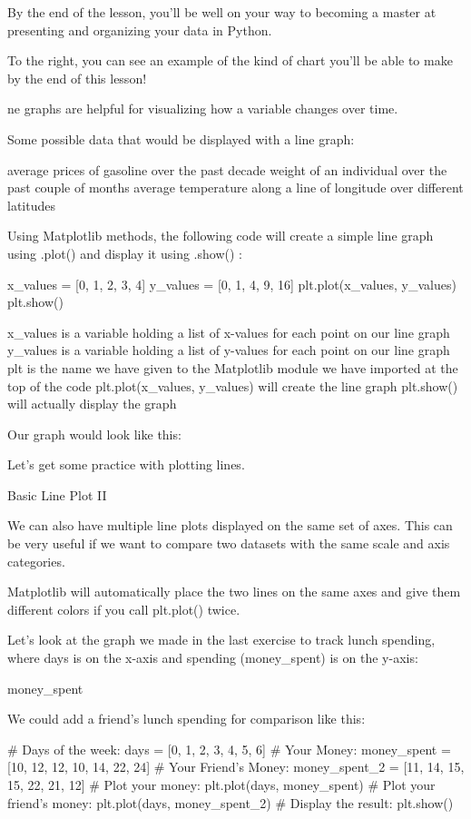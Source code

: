 \documentclass{journal}
\begin{document}
By the end of the lesson, you’ll be well on your way to becoming a master at presenting and organizing your data in Python.

To the right, you can see an example of the kind of chart you’ll be able to make by the end of this lesson!


ne graphs are helpful for visualizing how a variable changes over time.

Some possible data that would be displayed with a line graph:

    average prices of gasoline over the past decade
    weight of an individual over the past couple of months
    average temperature along a line of longitude over different latitudes

Using Matplotlib methods, the following code will create a simple line graph using .plot() and display it using .show() :

x_values = [0, 1, 2, 3, 4]
y_values = [0, 1, 4, 9, 16]
plt.plot(x_values, y_values)
plt.show()

    x_values is a variable holding a list of x-values for each point on our line graph
    y_values is a variable holding a list of y-values for each point on our line graph
    plt is the name we have given to the Matplotlib module we have imported at the top of the code
    plt.plot(x_values, y_values) will create the line graph
    plt.show() will actually display the graph

Our graph would look like this:

Let’s get some practice with plotting lines.


Basic Line Plot II

We can also have multiple line plots displayed on the same set of axes. This can be very useful if we want to compare two datasets with the same scale and axis categories.

Matplotlib will automatically place the two lines on the same axes and give them different colors if you call plt.plot() twice.

Let’s look at the graph we made in the last exercise to track lunch spending, where days is on the x-axis and spending (money_spent) is on the y-axis:

money_spent

We could add a friend’s lunch spending for comparison like this:

# Days of the week:
days = [0, 1, 2, 3, 4, 5, 6]
# Your Money:
money_spent = [10, 12, 12, 10, 14, 22, 24]
# Your Friend's Money:
money_spent_2 = [11, 14, 15, 15, 22, 21, 12]
# Plot your money:
plt.plot(days, money_spent)
# Plot your friend's money:
plt.plot(days, money_spent_2)
# Display the result:
plt.show()
\end{document}
